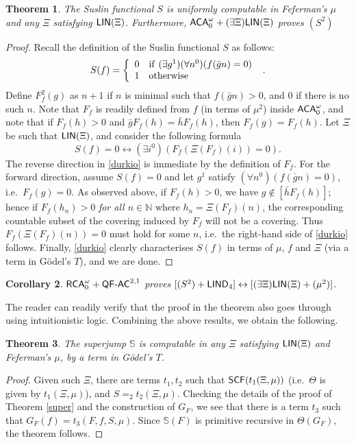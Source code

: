\documentclass[reqno]{amsart}
\newtheorem{thm}{Theorem}
\newtheorem{cor}[thm]{Corollary}
\newcommand\be{\begin{equation}}
\newcommand\ee{\end{equation}}
\def\RCAo{\textup{\textsf{RCA}}_{0}^{\omega}}
\def\ACAo{\textup{\textsf{ACA}}_{0}^{\omega}}
\def\N{{\mathbb  N}}
\def\asa{\leftrightarrow}
\def\QFAC{\textup{\textsf{QF-AC}}}
\def\LIND{\textup{\textsf{LIND}}}
\def\LIN{\textup{\textsf{LIN}}}
\def\SJ{\mathbb{S}}
\def\SCF{\textup{\textsf{SCF}}}
\numberwithin{equation}{section}
\numberwithin{thm}{section}
\begin{document}
\begin{thm}\label{super2}
The Suslin functional $S$ is uniformly computable in Feferman's $\mu$ and any $\Xi$ satisfying $\LIN(\Xi)$.
Furthermore, $\ACAo+(\exists \Xi)\LIN(\Xi)$ proves $(S^{2})$
\end{thm}
\begin{proof}
Recall the definition of the Suslin functional $S$ as follows:
\[
S(f) = \left\{ \begin{array}{cl} 0&{\rm if~} (\exists g^1) (\forall n^0) (f(\bar gn) = 0) \\ 1 & {\rm otherwise}\end{array}\right.~.
\]
Define $F^2_f(g)$ as $n+1$ if $n$ is minimal such that $f(\bar gn) > 0$,  and $0$ if there is no such $n$.
Note that $F_f$ is readily defined from $f$ (in terms of $\mu^{2}$) inside $\ACAo$, and note that if $F_f(h) > 0$ and $\bar gF_f(h) = \bar hF_f(h)$, then $F_f(g) = F_f(h)$.
Let $\Xi$ be such that $\LIN(\Xi)$, and consider the following formula  
\be\label{durkio}
S(f) = 0 \asa (\exists i^{0} )(F_f(\Xi(F_{f})(i)) = 0).
\ee
The reverse direction in \eqref{durkio} is immediate by the definition of $F_{f}$.  For the forward direction, assume $S(f)=0$ and let $g^{1}$ satisfy $(\forall n^0)(f(\bar gn) = 0)$, i.e.\ $F_f(g) = 0$. As observed above, if $F_f(h) > 0$, we have  $g \not\in [\bar h F_f(h)]$; hence if $F_f(h_n) > 0$ \emph{for all $n\in \N$} where $h_{n} = \Xi(F_f)(n)$, the corresponding countable subset of the covering induced by $F_f$ will not be a covering.  Thus $F_f(\Xi(F_f)(n)) = 0$ must hold for some $n$, i.e.\ the right-hand side of \eqref{durkio} follows.
Finally, \eqref{durkio} clearly characterises $S(f)$ in terms of $\mu$, $f$ and $\Xi$ (via a term in G\"{o}del's $T$), and we are done.
\end{proof}
\begin{cor}
$\RCAo+\QFAC^{2,1}$ proves $[(S^{2})+\LIND_{4}]\asa [(\exists \Xi)\LIN(\Xi)+(\mu^{2})]$.
\end{cor}
The reader can readily verify that the proof in the theorem also goes through using intuitionistic logic.  
Combining the above results, we obtain the following. 
\begin{thm}\label{superduper}
The superjump $\SJ$ is computable in any $\Xi$ satisfying $\LIN(\Xi)$ and Feferman's $\mu$, by a term in G\"{o}del's $T$.
\end{thm}
\begin{proof} Given such $\Xi$, there are terms $t_1, t_2$ such that $\SCF(t_1(\Xi,\mu))$ (i.e.\ $\Theta$ is given by $t_1(\Xi,\mu)$), and $S =_{2} t_2(\Xi,\mu)$. Checking the details  of the proof of Theorem \ref{super} and the construction of $G_F$, we see that there is a term $t_3$ such that $G_F(f) = t_3(F,f,S,\mu)$. Since $\SJ(F)$ is primitive recursive in $\Theta(G_F)$, the theorem follows.
\end{proof}
\end{document}
